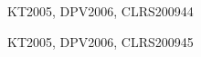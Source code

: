 \begin{syllabus}
\begin{unit}{\ALDistributedAlgorithmsDef}{KT2005, DPV2006, CLRS2009}{4}{4}
   \ALDistributedAlgorithmsAllTopics
   \ALDistributedAlgorithmsAllObjectives
\end{unit}

\begin{unit}{\ALPversusNPDef}{KT2005, DPV2006, CLRS2009}{4}{5}
   \ALPversusNPAllTopics
   \ALPversusNPAllObjectives
\end{unit}



\begin{coursebibliography}
\end{coursebibliography}

\end{syllabus}
